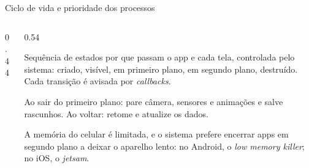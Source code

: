 \begin{frame}{Ciclo de vida e prioridade dos processos}
  \begin{columns}[c]
    \begin{column}{0.44\textwidth}
      \centering
    \end{column}
    \begin{column}{0.54\textwidth}
      \begin{definicao}
        Sequência de estados por que passam o app e cada tela, controlada pelo sistema: criado, visível, em primeiro plano, em segundo plano, destruído. Cada transição é avisada por \emph{callbacks}.
      \end{definicao}
      \begin{conceito}
        Ao sair do primeiro plano: pare câmera, sensores e animações e salve rascunhos. Ao voltar: retome e atualize os dados.
      \end{conceito}
      \begin{pordentro}
        A memória do celular é limitada, e o sistema prefere encerrar apps em segundo plano a deixar o aparelho lento: no Android, o \emph{low memory killer}; no iOS, o \emph{jetsam}.
      \end{pordentro}
    \end{column}
  \end{columns}
\end{frame}

